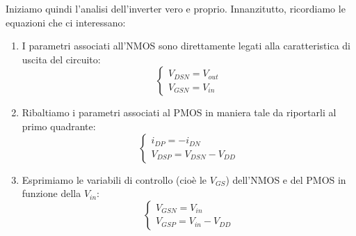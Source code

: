 \documentclass[a4paper,11pt]{article}
\begin{document}
Iniziamo quindi l'analisi dell'inverter vero e proprio.
Innanzitutto, ricordiamo le equazioni che ci interessano:
\begin{enumerate}
\item I parametri associati all'NMOS sono direttamente legati alla caratteristica di uscita del circuito:
$$
\begin{cases}
V_{DSN} = V_{out} \\
V_{GSN} = V_{in}
\end{cases}
$$
\item Ribaltiamo i parametri associati al PMOS in maniera tale da riportarli al primo quadrante:
$$
\begin{cases}
i_{DP} = -i_{DN} \\
V_{DSP} = V_{DSN} - V_{DD}
\end{cases}
$$
\item Esprimiamo le variabili di controllo (cioè le $V_{GS}$) dell'NMOS e del PMOS in funzione della $V_{in}$:
$$
\begin{cases}
V_{GSN} = V_{in} \\
V_{GSP} = V_{in} - V_{DD}
\end{cases}
$$
\end{enumerate}
\end{document}
